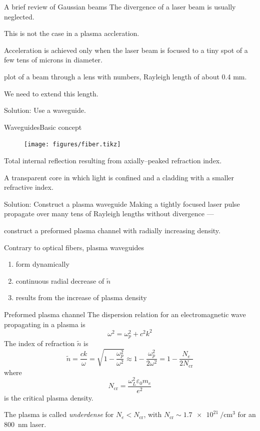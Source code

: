 \documentclass[]{beamer}
\begin{document}
  \begin{frame}{A brief review of Gaussian beams}
    The divergence of a laser beam is usually neglected.

    This is not the case in a plasma accleration.
    
    Acceleration is achieved only when the laser beam is focused to a tiny spot of a few tens of microns in diameter.

    \begin{center}
      plot of a beam through a lens with numbers, Rayleigh length of about 0.4 mm.
    \end{center}
    We need to extend this length.

    Solution: Use a waveguide.
  \end{frame}
  \begin{frame}{Waveguides}{Basic concept}
  \begin{figure}
     \texttt{[image: figures/fiber.tikz]}
   \end{figure}
   Total internal reflection resulting from axially--peaked refraction index.

   A transparent core in which light is confined and a cladding with a smaller refractive index.
  \end{frame}
  \begin{frame}{Solution: Construct a plasma waveguide}
    Making a tightly focused laser pulse propagate over many tens of Rayleigh lengths without divergence ---

    construct a preformed plasma channel with radially increasing density.

    Contrary to optical fibers, plasma waveguides
    \begin{enumerate}
      \item form dynamically
      \item continuous radial decrease of $\tilde n$
      \item results from the increase of plasma density
    \end{enumerate}
  \end{frame}
  \begin{frame}{Preformed plasma channel}
  The dispersion relation for an electromagnetic wave propagating in a plasma is
  \begin{equation}
    \omega^2=\omega_p^2+c^2k^2
  \end{equation}
  The index of refraction $\tilde n$ is
  \begin{equation}
    \tilde{n}=\frac{c k}{\omega}=\sqrt{1-\frac{\omega_p^2}{\omega^2}}\approx1-\frac{\omega_p^2}{2\omega^2}=1-\frac{N_e}{2N_\text{cr}}
  \end{equation}
  where
    \begin{equation}
        N_\text{cr}=\frac{\omega_L^2\varepsilon_0 m_e}{e^2}
    \end{equation}
    is the critical plasma density.

    The plasma is called \textit{underdense} for $N_e < N_\text{cr}$, with $N_\text{cr}\sim\SI{1.7e21}{\per\cubic\cm}$ for an \SI{800}{\nm} laser.
\end{frame}
\end{document}
